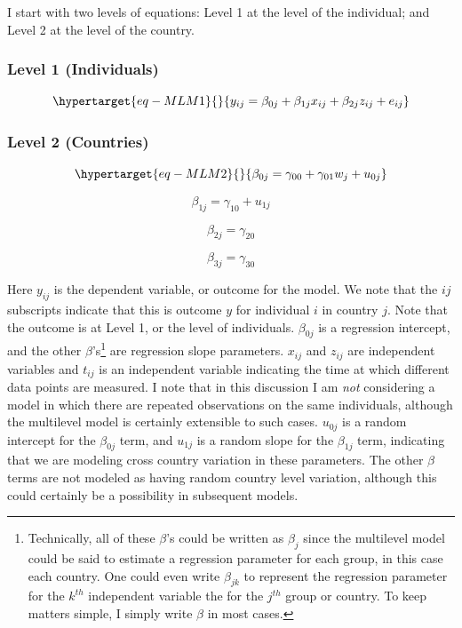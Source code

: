 \documentclass[
  letterpaper,
  DIV=11,
  numbers=noendperiod]{scrreprt}
\begin{document}
I start with two levels of equations: Level 1 at the level of the
individual; and Level 2 at the level of the country.

\hypertarget{level-1-individuals}{%
\subsubsection{Level 1 (Individuals)}\label{level-1-individuals}}

\begin{equation}\protect\hypertarget{eq-MLM1}{}{y_{ij} = \beta_{0j} + \beta_{1j} x_{ij} + \beta_{2j} z_{ij} + e_{ij}}\label{eq-MLM1}\end{equation}

\hypertarget{level-2-countries}{%
\subsubsection{Level 2 (Countries)}\label{level-2-countries}}

\begin{equation}\protect\hypertarget{eq-MLM2}{}{\beta_{0j} = \gamma_{00} +\gamma_{01} w_j + u_{0j}}\label{eq-MLM2}\end{equation}

\[\beta_{1j} = \gamma_{10} + u_{1j}\]

\[\beta_{2j} = \gamma_{20}\]

\[\beta_{3j} = \gamma_{30}\]

Here \(y_{ij}\) is the dependent variable, or outcome for the model. We
note that the \(ij\) subscripts indicate that this is outcome \(y\) for
individual \(i\) in country \(j\). Note that the outcome is at Level 1,
or the level of individuals. \(\beta_{0j}\) is a regression intercept,
and the other \(\beta\)'s\footnote{Technically, all of these \(\beta\)'s
  could be written as \(\beta_j\) since the multilevel model could be
  said to estimate a regression parameter for each group, in this case
  each country. One could even write \(\beta_{jk}\) to represent the
  regression parameter for the \(k^{th}\) independent variable the for
  the \(j^{th}\) group or country. To keep matters simple, I simply
  write \(\beta\) in most cases.} are regression slope parameters.
\(x_{ij}\) and \(z_{ij}\) are independent variables and \(t_{ij}\) is an
independent variable indicating the time at which different data points
are measured. I note that in this discussion I am \emph{not} considering
a model in which there are repeated observations on the same
individuals, although the multilevel model is certainly extensible to
such cases. \(u_{0j}\) is a random intercept for the \(\beta_{0j}\)
term, and \(u_{1j}\) is a random slope for the \(\beta_{1j}\) term,
indicating that we are modeling cross country variation in these
parameters. The other \(\beta\) terms are not modeled as having random
country level variation, although this could certainly be a possibility
in subsequent models.
\end{document}

